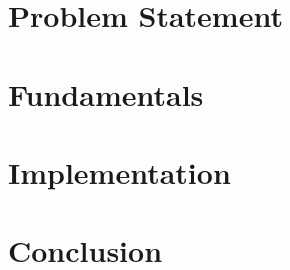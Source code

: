 \documentclass[a4paper,11pt,
headsepline,           %
oneside,               %
pointlessnumbers,      %
bibtotoc,              %
DIV=15,               %
BCOR15mm               %
]{scrartcl}
\newcommand{\fullname}{Paul Nykiel}
\newcommand{\matnr}{941496}
\begin{document}
\newpage


\tableofcontents

\newpage

\section{Problem Statement}


\section{Fundamentals}


\section{Implementation}


\section{Conclusion}


\newpage
\appendix

\printbibliography






\end{document}
